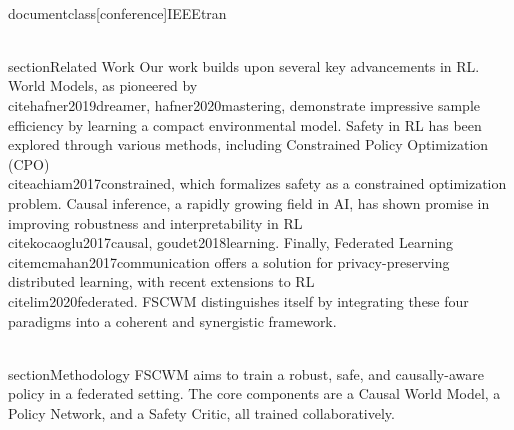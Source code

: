 \\documentclass[conference]{IEEEtran}
\begin{document}
\\section{Related Work}
Our work builds upon several key advancements in RL. World Models, as pioneered by \\cite{hafner2019dreamer, hafner2020mastering}, demonstrate impressive sample efficiency by learning a compact environmental model. Safety in RL has been explored through various methods, including Constrained Policy Optimization (CPO) \\cite{achiam2017constrained}, which formalizes safety as a constrained optimization problem. Causal inference, a rapidly growing field in AI, has shown promise in improving robustness and interpretability in RL \\cite{kocaoglu2017causal, goudet2018learning}. Finally, Federated Learning \\cite{mcmahan2017communication} offers a solution for privacy-preserving distributed learning, with recent extensions to RL \\cite{lim2020federated}. FSCWM distinguishes itself by integrating these four paradigms into a coherent and synergistic framework.

\\section{Methodology}
FSCWM aims to train a robust, safe, and causally-aware policy in a federated setting. The core components are a Causal World Model, a Policy Network, and a Safety Critic, all trained collaboratively.
\end{document}
